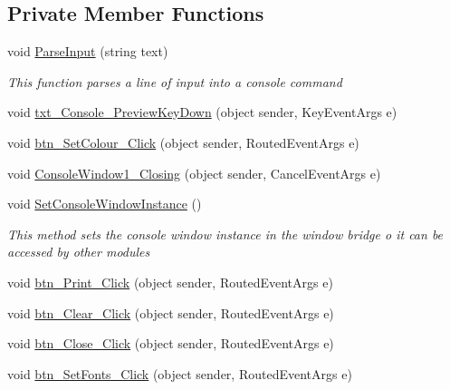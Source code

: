 \subsection*{Private Member Functions}
\begin{DoxyCompactItemize}
\item 
void \hyperlink{class_c_p_u___o_s___simulator_1_1_console_window_a0a66aa7f0e333cc919589a7ce4d584c0}{Parse\+Input} (string text)
\begin{DoxyCompactList}\small\item\em This function parses a line of input into a console command \end{DoxyCompactList}\item 
void \hyperlink{class_c_p_u___o_s___simulator_1_1_console_window_aabd331e8c3a83c87ccd2e09c3959408d}{txt\+\_\+\+Console\+\_\+\+Preview\+Key\+Down} (object sender, Key\+Event\+Args e)
\item 
void \hyperlink{class_c_p_u___o_s___simulator_1_1_console_window_a1de6be8bb7f4f581a9e4131a0408e632}{btn\+\_\+\+Set\+Colour\+\_\+\+Click} (object sender, Routed\+Event\+Args e)
\item 
void \hyperlink{class_c_p_u___o_s___simulator_1_1_console_window_a6b842220939aa42076c6770d646e2cc3}{Console\+Window1\+\_\+\+Closing} (object sender, Cancel\+Event\+Args e)
\item 
void \hyperlink{class_c_p_u___o_s___simulator_1_1_console_window_a8719d25b2617a32a78511d9e584d90a0}{Set\+Console\+Window\+Instance} ()
\begin{DoxyCompactList}\small\item\em This method sets the console window instance in the window bridge o it can be accessed by other modules \end{DoxyCompactList}\item 
void \hyperlink{class_c_p_u___o_s___simulator_1_1_console_window_ae362d36774ccfa84e775d6460e938a47}{btn\+\_\+\+Print\+\_\+\+Click} (object sender, Routed\+Event\+Args e)
\item 
void \hyperlink{class_c_p_u___o_s___simulator_1_1_console_window_a5bdaca75d834561bcf3e8ebef9f74926}{btn\+\_\+\+Clear\+\_\+\+Click} (object sender, Routed\+Event\+Args e)
\item 
void \hyperlink{class_c_p_u___o_s___simulator_1_1_console_window_ac971a3a0719009235a1dc369f6436df1}{btn\+\_\+\+Close\+\_\+\+Click} (object sender, Routed\+Event\+Args e)
\item 
void \hyperlink{class_c_p_u___o_s___simulator_1_1_console_window_a9b4298ff51320694cef9d160759700a3}{btn\+\_\+\+Set\+Fonts\+\_\+\+Click} (object sender, Routed\+Event\+Args e)

\end{DoxyCompactItemize}
